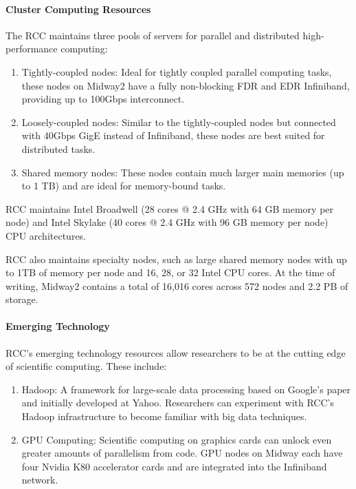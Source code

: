 \paragraph*{Cluster Computing Resources}

The RCC maintains three pools of servers for parallel and distributed high-performance computing:

\begin{enumerate}
\item Tightly-coupled nodes: Ideal for tightly coupled parallel computing tasks, these nodes on Midway2 have a fully non-blocking FDR and EDR Infiniband, providing up to 100Gbps interconnect.

\item  Loosely-coupled nodes: Similar to the tightly-coupled nodes but connected with 40Gbps GigE instead of Infiniband, these nodes are best suited for distributed tasks.

\item Shared memory nodes: These nodes contain much larger main memories (up to 1 TB) and are ideal for memory-bound tasks.

\end{enumerate}
RCC maintains Intel Broadwell (28 cores @ 2.4 GHz with 64 GB memory per node) and Intel Skylake (40 cores @ 2.4 GHz with 96 GB memory per node) CPU architectures.

RCC also maintains specialty nodes, such as large shared memory nodes with up to 1TB of memory per node and 16, 28, or 32 Intel CPU cores. At the time of writing, Midway2 contains a total of 16,016 cores across 572 nodes and 2.2 PB of storage.

\paragraph*{Emerging Technology}

RCC’s emerging technology resources allow researchers to be at the cutting edge of scientific computing. These include:

\begin{enumerate}
\item  Hadoop: A framework for large-scale data processing based on Google’s paper and initially developed at Yahoo. Researchers can experiment with RCC's Hadoop infrastructure to become familiar with big data techniques.

\item  GPU Computing: Scientific computing on graphics cards can unlock even greater amounts of parallelism from code. GPU nodes on Midway each have four Nvidia K80 accelerator cards and are integrated into the Infiniband network.
\end{enumerate}

